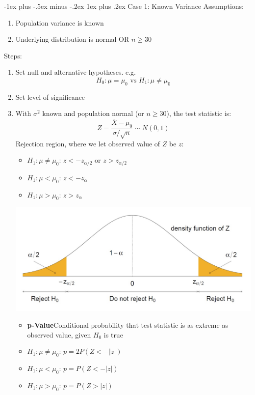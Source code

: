 \documentclass[12pt, landscape]{article}
\makeatletter
\renewcommand{\subsubsection}{\@startsection{subsubsection}{3}{0.1mm}%
                                {-1ex plus -.5ex minus -.2ex}%
                                {1ex plus .2ex}%
                                {\normalfont\small\bfseries}}
\makeatother
\begin{document}
\begin{multicols*}{3}
\subsubsection{Case 1: Known Variance}
Assumptions:
\begin{enumerate}
    \item Population variance is known
    \item Underlying distribution is normal OR $n \geq 30$
\end{enumerate} 
Steps:
\begin{enumerate}
    \item Set null and alternative hypotheses. e.g.
    \[H_0: \mu = \mu_0 \text{ vs } H_1: \mu \neq \mu_0\]
    \item Set level of significance
    \item With $\sigma^2$ known and population normal (or $n \geq 30$), the test statistic is:
    \[Z = \frac{\bar{X} - \mu_0}{\sigma / \sqrt{n}} \sim N(0,1)\]
    Rejection region, where we let observed value of $Z$ be $z$:
    \begin{itemize}
        \item $H_1: \mu \neq \mu_0$: $z < -z_{\alpha/2}$ or $z > z_{\alpha/2}$
        \item $H_1: \mu < \mu_0$: $z < -z_{\alpha}$
        \item $H_1: \mu > \mu_0$: $z > z_{\alpha}$
    \end{itemize}

    \includegraphics[scale=0.45]{rejection-region}
    \begin{itemize}
        \item \textbf{p-Value}{Conditional probability that test statistic is as extreme as observed value, given $H_0$ is true}
        \item $H_1: \mu \neq \mu_0$: $p = 2P(Z < -|z|)$
        \item $H_1: \mu < \mu_0$: $p = P(Z < -|z|)$
        \item $H_1: \mu > \mu_0$: $p = P(Z > |z|)$
    \end{itemize}


\end{enumerate}
\end{multicols*}
\end{document}

